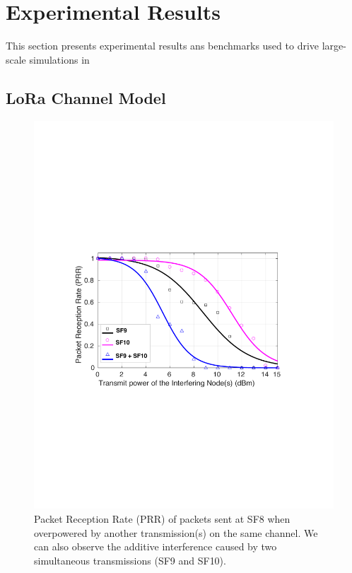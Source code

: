 \section{Experimental Results}

\label{sec:eval}



This section presents experimental results ans benchmarks used to drive large-scale simulations in 

\subsection{LoRa Channel Model}

\begin{figure}%
\centering
\includegraphics[width=0.8\columnwidth]{figures/aim-sf}
\compactimg
\caption{Packet Reception Rate (PRR) of packets sent at SF8 when overpowered by another transmission(s) on the same channel. We can also observe the additive interference caused by two simultaneous transmissions (SF9 and SF10).}
\label{fig:aim-sf}
\compactimg
\end{figure}

